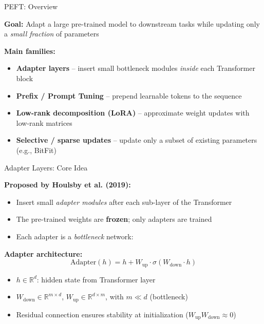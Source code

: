\documentclass[11pt,compress,t,notes=noshow, xcolor=table]{beamer}
\begin{document}
\begin{frame}{PEFT: Overview}

\vfill

\textbf{Goal:} Adapt a large pre-trained model to downstream tasks while updating only a \textit{small fraction} of parameters

\vfill

\textbf{Main families:}
\begin{itemize}
  \item \textbf{Adapter layers} -- insert small bottleneck modules \textit{inside} each Transformer block 
  \item \textbf{Prefix / Prompt Tuning} -- prepend learnable tokens to the sequence 
  \item \textbf{Low-rank decomposition (LoRA)} -- approximate weight updates with low-rank matrices 
  \item \textbf{Selective / sparse updates} -- update only a subset of existing parameters (e.g., BitFit)
\end{itemize}

\vfill

\end{frame}


\begin{frame}{Adapter Layers: Core Idea}

\vfill

\textbf{Proposed by Houlsby et al. (2019):}
\begin{itemize}
  \item Insert small \textit{adapter modules} after each sub-layer of the Transformer
  \item The pre-trained weights are \textbf{frozen}; only adapters are trained
  \item Each adapter is a \textit{bottleneck} network:
\end{itemize}

\vfill

\textbf{Adapter architecture:}
$$\text{Adapter}(h) = h + W_\text{up} \cdot \sigma(W_\text{down} \cdot h)$$
\begin{itemize}
  \item $h \in \mathbb{R}^d$: hidden state from Transformer layer
  \item $W_\text{down} \in \mathbb{R}^{m \times d}$, $W_\text{up} \in \mathbb{R}^{d \times m}$, with $m \ll d$ (bottleneck)
  \item Residual connection ensures stability at initialization ($W_\text{up} W_\text{down} \approx 0$)
\end{itemize}

\vfill

\end{frame}
\end{document}
